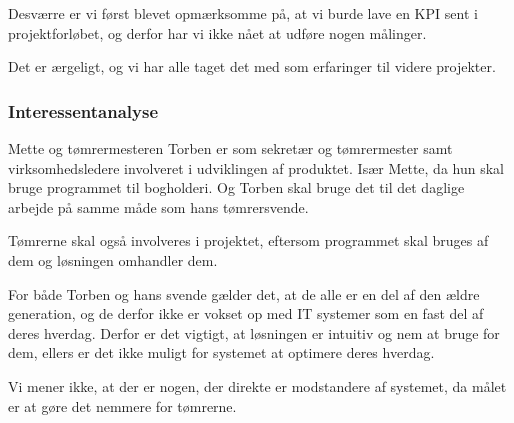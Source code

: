 Desværre er vi først blevet opmærksomme på, at vi burde lave en KPI sent i projektforløbet, og derfor har vi ikke nået at udføre nogen målinger.

Det er ærgeligt, og vi har alle taget det med som erfaringer til videre projekter.

\subsubsection{Interessentanalyse}\label{interessent}
Mette og tømrermesteren Torben er som sekretær og tømrermester samt virksomhedsledere involveret i udviklingen af produktet.
Især Mette, da hun skal bruge programmet til bogholderi.
Og Torben skal bruge det til det daglige arbejde på samme måde som hans tømrersvende.

Tømrerne skal også involveres i projektet, eftersom programmet skal bruges af dem og løsningen omhandler dem.

For både Torben og hans svende gælder det, at de alle er en del af den ældre generation, og de derfor ikke er vokset op med IT systemer som en fast del af deres hverdag.
Derfor er det vigtigt, at løsningen er intuitiv og nem at bruge for dem, ellers er det ikke muligt for systemet at optimere deres hverdag.

Vi mener ikke, at der er nogen, der direkte er modstandere af systemet, da målet er at gøre det nemmere for tømrerne.